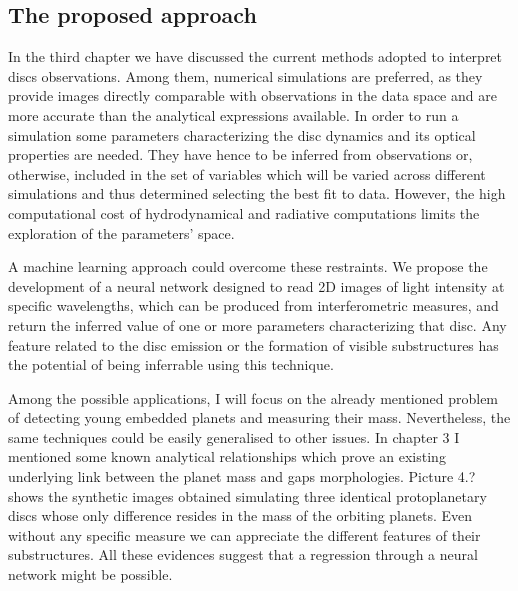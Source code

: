 \documentclass[a4paper,10pt]{report}
\begin{document}
\subsection{The proposed approach}

In the third chapter we have discussed the current methods adopted to interpret discs observations.
Among them, numerical simulations are preferred, as they provide images
directly comparable with observations in the data space and are more accurate than the analytical expressions available.
In order to run a simulation some parameters characterizing the disc dynamics and its optical properties are needed.
They have hence to be inferred from observations or, otherwise, included in the set of variables which will be varied across different simulations
and thus determined selecting the best fit to data. However, the high computational cost of hydrodynamical and radiative 
computations limits the exploration of the parameters' space.

A machine learning approach could overcome these restraints. We propose the development
of a neural network designed to read 2D images of light intensity at specific wavelengths,
which can be produced from interferometric measures, and return the inferred value of one or more 
parameters characterizing that disc. Any feature related to the disc emission or the formation of visible substructures 
has the potential of being inferrable using this technique.

Among the possible applications, I will focus on the already mentioned problem of detecting young embedded planets and measuring their mass.
Nevertheless, the same techniques could be easily generalised to other issues.
In chapter 3 I mentioned some known analytical relationships which prove an existing underlying link
between the planet mass and gaps morphologies. Picture 4.? shows the synthetic images obtained simulating
three identical protoplanetary discs whose only difference resides in the mass of the orbiting planets. 
Even without any specific measure we can appreciate the different features of their substructures.
All these evidences suggest that a regression through a neural network might be possible.
\end{document}
